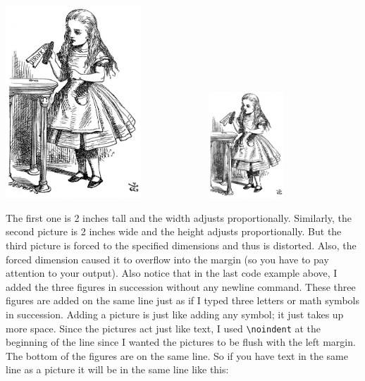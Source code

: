 \documentclass{article}
\newcommand{\nid}{\noindent} %
\begin{document}
\includegraphics[width =2in]{alice}
\includegraphics[height=4cm, width=3in]{alice}

\nid The first one is 2 inches tall and the width adjusts proportionally. Similarly, the second picture is 2 inches wide and the height adjusts proportionally.  But the third picture is forced to the specified dimensions and thus is distorted. Also, the forced dimension caused it to overflow into the margin (so you have to pay attention to your output).  Also notice that in the last code example above, I added the three figures in succession without any newline command.  These three figures are added on the same line just as if I typed three letters or math symbols in succession.  Adding a picture is just like adding any symbol; it just takes up more space.  Since the pictures act just like text, I used \verb|\noindent| at the beginning of the line since I wanted the pictures to be flush with the left margin.  The bottom of the figures are on the same line.  So if you have text in the same line as a picture it will be in the same line like this:
\end{document}
